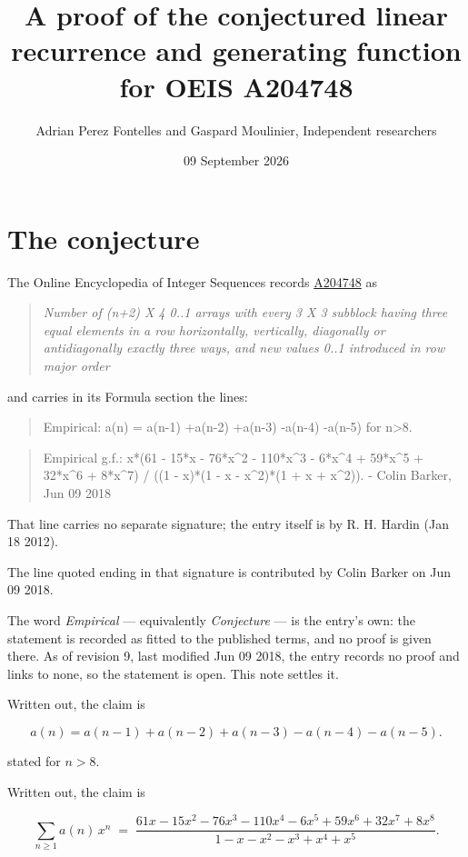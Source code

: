\documentclass[11pt]{article}
\title{A proof of the conjectured linear recurrence and generating function for OEIS A204748}
\author{Adrian Perez Fontelles and Gaspard Moulinier, Independent researchers}
\date{09 September 2026}
\theoremstyle{definition}
\begin{document}
\maketitle
\section{The conjecture}

The Online Encyclopedia of Integer Sequences records \href{https://oeis.org/A204748}{A204748} as

\begin{quote}\itshape Number of (n+2) X 4 0..1 arrays with every 3 X 3 subblock having three equal elements in a row horizontally, vertically, diagonally or antidiagonally exactly three ways, and new values 0..1 introduced in row major order\end{quote}

and carries in its Formula section the lines:

\begin{quote}\ttfamily Empirical: a(n) = a(n-1) +a(n-2) +a(n-3) -a(n-4) -a(n-5) for n>8.\end{quote}

\begin{quote}\ttfamily Empirical g.f.: x*(61 - 15*x - 76*x\textasciicircum{}2 - 110*x\textasciicircum{}3 - 6*x\textasciicircum{}4 + 59*x\textasciicircum{}5 + 32*x\textasciicircum{}6 + 8*x\textasciicircum{}7) / ((1 - x)*(1 - x - x\textasciicircum{}2)*(1 + x + x\textasciicircum{}2)). - Colin Barker, Jun 09 2018\end{quote}

That line carries no separate signature; the entry itself is by R. H. Hardin (Jan 18 2012).

The line quoted ending in that signature is contributed by Colin Barker on Jun 09 2018.

The word {\itshape Empirical} --- equivalently {\itshape Conjecture} --- is the entry's own: the statement is recorded as fitted to the published terms, and no proof is given there. As of revision 9, last modified Jun 09 2018, the entry records no proof and links to none, so the statement is open. This note settles it.

Written out, the claim is

\[a(n) = a(n-1) + a(n-2) + a(n-3) - a(n-4) - a(n-5).\]

stated for $n > 8$.

Written out, the claim is

\[\sum_{n \ge 1} a(n)\,x^n \;=\; \frac{61x - 15x^{2} - 76x^{3} - 110x^{4} - 6x^{5} + 59x^{6} + 32x^{7} + 8x^{8}}{1 - x - x^{2} - x^{3} + x^{4} + x^{5}}.\]
\end{document}
